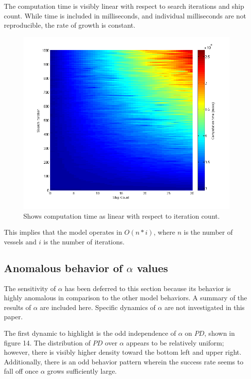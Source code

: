 \documentclass[a4paper]{article}
\begin{document}
The computation time is visibly linear with respect to search iterations and ship count. While time is included in milliseconds, and individual milliseconds are not reproducible, the rate of growth is constant. 

\begin{figure}[H]\begin{center}
\includegraphics[scale=0.7]{../Matlab/Images/CompTimeByItersShips.png}
\caption{Shows computation time as linear with respect to iteration count.}
\end{center}\end{figure}

This implies that the model operates in $O(n*i)$, where $n$ is the number of vessels and $i$ is the number of iterations.

\subsection{Anomalous behavior of $\alpha$ values}

The sensitivity of $\alpha$ has been deferred to this section because its behavior is highly anomalous in comparison to the other model behaviors. A summary of the results of $\alpha$ are included here. Specific dynamics of $\alpha$ are not investigated in this paper.

The first dynamic to highlight is the odd independence of $\alpha$ on $PD$, shown in figure 14. The distribution of $PD$ over $\alpha$ appears to be relatively uniform; however, there is visibly higher density toward the bottom left and upper right. Additionally, there is an odd behavior pattern wherein the success rate seems to fall off once $\alpha$ grows sufficiently large. 
\end{document}
